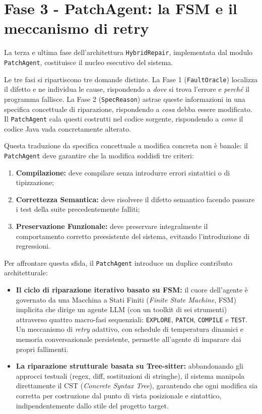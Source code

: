 \newpage
\section{Fase 3 - PatchAgent: la FSM e il meccanismo di retry}
\label{sec:3.4}
\label{sec:fase3}
La terza e ultima fase dell'architettura \texttt{HybridRepair},
implementata dal modulo \texttt{PatchAgent}, costituisce il nucleo
esecutivo del sistema.

Le tre fasi si ripartiscono tre domande distinte. La Fase 1 (\texttt{FaultOracle})
localizza il difetto e ne individua le cause, rispondendo a
\textit{dove} si trova l'errore e \textit{perché} il programma fallisce.
La Fase 2 (\texttt{SpecReason}) astrae queste informazioni in una specifica
concettuale di riparazione, rispondendo a \textit{cosa} debba essere
modificato. Il \texttt{PatchAgent} cala questi costrutti nel codice sorgente,
rispondendo a \textit{come} il codice Java vada concretamente alterato.

Questa traduzione da specifica concettuale a modifica concreta non è banale: il \texttt{PatchAgent} deve
garantire che la modifica soddisfi tre criteri:
\begin{enumerate}
    \item \textbf{Compilazione:} deve compilare senza introdurre
    errori sintattici o di tipizzazione;
    \item \textbf{Correttezza Semantica:} deve risolvere il
    difetto semantico facendo passare i test della
    suite precedentemente falliti;
    \item \textbf{Preservazione Funzionale:} deve preservare integralmente
    il comportamento corretto preesistente del sistema,
    evitando l'introduzione di regressioni.
\end{enumerate}

Per affrontare questa sfida, il \texttt{PatchAgent} introduce un duplice contributo architetturale:
\begin{itemize}
    \item \textbf{Il ciclo di riparazione iterativo basato su FSM:} il cuore dell'agente è governato da una
    Macchina a Stati Finiti (\textit{Finite State Machine}, FSM) implicita che dirige un agente LLM (con un toolkit
    di sei strumenti) attraverso quattro macro-fasi sequenziali: \texttt{EXPLORE}, \texttt{PATCH}, \texttt{COMPILE}
    e \texttt{TEST}. Un meccanismo di \textit{retry} adattivo, con schedule di temperatura dinamici e memoria
    conversazionale persistente, permette all'agente di imparare dai propri fallimenti.
    \item \textbf{La riparazione strutturale basata su Tree-sitter:} abbandonando gli approcci testuali (regex,
    diff, sostituzioni di stringhe), il sistema manipola direttamente il CST (\textit{Concrete Syntax Tree}),
    garantendo che ogni modifica sia corretta per costruzione dal punto di vista posizionale e sintattico,
    indipendentemente dallo stile del progetto target.
\end{itemize}

